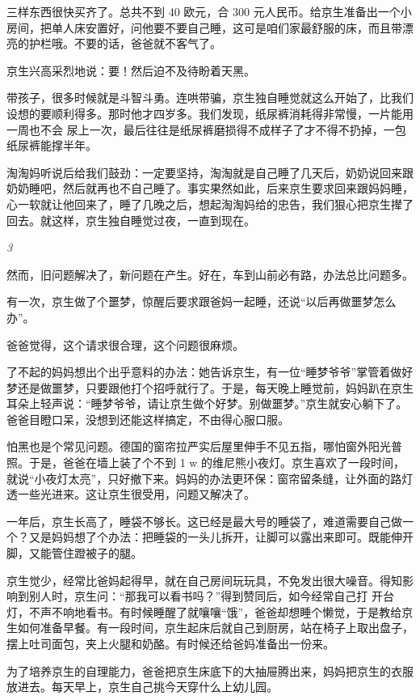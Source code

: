\documentclass[twoside,openright,headings=optiontohead]{ctexbook} %
\begin{document}
{三样东西很快买齐了。总共不到 40 欧元，合 300
元人民币。给京生准备出一个小房间，把单人床安置好，问他要不要自己睡，这可是咱们家最舒服的床，而且带漂亮的护栏哦。不要的话，爸爸就不客气了。

京生兴高采烈地说：要！然后迫不及待盼着天黑。

带孩子，很多时候就是斗智斗勇。连哄带骗，京生独自睡觉就这么开始了，比我们设想的要顺利得多。那时他才四岁多。我们发现，纸尿裤消耗得非常慢，一片能用一周也不会
尿上一次，最后往往是纸尿裤磨损得不成样子了才不得不扔掉，一包纸尿裤能撑半年。

淘淘妈听说后给我们鼓劲：一定要坚持，淘淘就是自己睡了几天后，奶奶说回来跟奶奶睡吧，然后就再也不自己睡了。事实果然如此，后来京生要求回来跟妈妈睡，心一软就让他回来了，睡了几晚之后，想起淘淘妈给的忠告，我们狠心把京生撵了回去。就这样，京生独自睡觉过夜，一直到现在。

\emph{3}

然而，旧问题解决了，新问题在产生。好在，车到山前必有路，办法总比问题多。

有一次，京生做了个噩梦，惊醒后要求跟爸妈一起睡，还说``以后再做噩梦怎么办''。

爸爸觉得，这个请求很合理，这个问题很麻烦。

了不起的妈妈想出个出乎意料的办法：她告诉京生，有一位``睡梦爷爷''掌管着做好梦还是做噩梦，只要跟他打个招呼就行了。于是，每天晚上睡觉前，妈妈趴在京生耳朵上轻声说：``睡梦爷爷，请让京生做个好梦。别做噩梦。''京生就安心躺下了。爸爸目瞪口呆，没想到还能这样搞定，不由得心服口服。

怕黑也是个常见问题。德国的窗帘拉严实后屋里伸手不见五指，哪怕窗外阳光普照。于是，爸爸在墙上装了个不到
1 w
的维尼熊小夜灯。京生喜欢了一段时间，就说``小夜灯太亮''，只好撤下来。妈妈的办法更环保：窗帘留条缝，让外面的路灯透一些光进来。这让京生很受用，问题又解决了。

一年后，京生长高了，睡袋不够长。这已经是最大号的睡袋了，难道需要自己做一个？又是妈妈想了个办法：把睡袋的一头儿拆开，让脚可以露出来即可。既能伸开脚，又能管住蹬被子的腿。

京生觉少，经常比爸妈起得早，就在自己房间玩玩具，不免发出很大噪音。得知影响到别人时，京生问：``那我可以看书吗？''得到赞同后，如今经常自己打
开台灯，不声不响地看书。有时候睡醒了就嚷嚷``饿''，爸爸却想睡个懒觉，于是教给京生如何准备早餐。有一段时间，京生起床后就自己到厨房，站在椅子上取出盘子，摆上吐司面包，夹上火腿和奶酪。有时候还给爸妈准备出一份来。

为了培养京生的自理能力，爸爸把京生床底下的大抽屉腾出来，妈妈把京生的衣服放进去。每天早上，京生自己挑今天穿什么上幼儿园。

}
\end{document}
